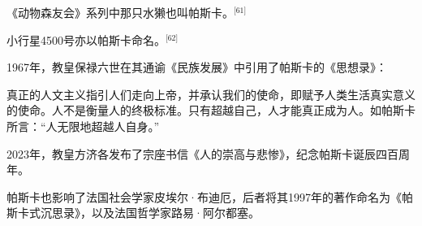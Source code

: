 《动物森友会》系列中那只水獭也叫帕斯卡。\(^\text{[61]}\)

小行星4500号亦以帕斯卡命名。\(^\text{[62]}\)

1967年，教皇保禄六世在其通谕《民族发展》中引用了帕斯卡的《思想录》：

真正的人文主义指引人们走向上帝，并承认我们的使命，即赋予人类生活真实意义的使命。人不是衡量人的终极标准。只有超越自己，人才能真正成为人。如帕斯卡所言：“人无限地超越人自身。”

2023年，教皇方济各发布了宗座书信《人的崇高与悲惨》，纪念帕斯卡诞辰四百周年。

帕斯卡也影响了法国社会学家皮埃尔·布迪厄，后者将其1997年的著作命名为《帕斯卡式沉思录》，以及法国哲学家路易·阿尔都塞。
